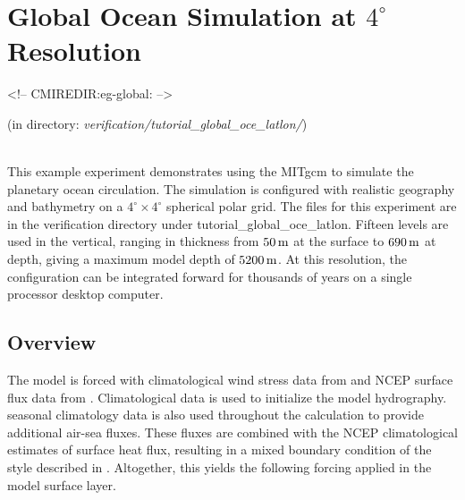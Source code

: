 
\section[Global Ocean MITgcm Example]{Global Ocean Simulation at $4^\circ$ Resolution}
\label{sec:eg-global}
\begin{rawhtml}
<!-- CMIREDIR:eg-global: -->
\end{rawhtml}
\begin{center}
(in directory: {\it verification/tutorial\_global\_oce\_latlon/})
\end{center}


\\

%
%


This example experiment demonstrates using the MITgcm to simulate the
planetary ocean circulation. The simulation is configured with
realistic geography and bathymetry on a $4^{\circ} \times 4^{\circ}$
spherical polar grid. The files for this experiment are in the
verification directory under tutorial\_global\_oce\_latlon. Fifteen
levels are used in the vertical, ranging in thickness from $50\,{\rm
  m}$ at the surface to $690\,{\rm m}$ at depth, giving a maximum
model depth of $5200\,{\rm m}$.  At this resolution, the configuration
can be integrated forward for thousands of years on a single processor
desktop computer.
\\
\subsection{Overview}

The model is forced with climatological wind stress data from
\citet{trenberth90} and NCEP surface flux data from
\citet{kalnay96}. Climatological data \citep{Levitus94} is
used to initialize the model hydrography. \citeauthor{Levitus94} seasonal
climatology data is also used throughout the calculation to provide
additional air-sea fluxes.  These fluxes are combined with the NCEP
climatological estimates of surface heat flux, resulting in a mixed
boundary condition of the style described in \citet{Haney}.
Altogether, this yields the following forcing applied in the model
surface layer.

